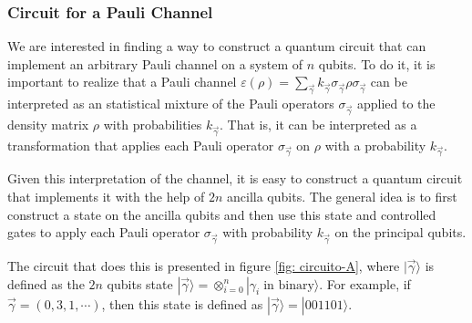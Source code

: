 \subsubsection{Circuit for a Pauli Channel}

We are interested in finding a way to construct a quantum circuit that can implement an arbitrary Pauli channel on a system of $n$ qubits. To do it, it is important to realize that a Pauli channel $\varepsilon (\rho) = \sum_{\vec{\gamma}} k_{\vec{\gamma}} \sigma_{\vec{\gamma}} \rho \sigma_{\vec{\gamma}}$ can be interpreted as an statistical mixture of the Pauli operators $\sigma_{\vec{\gamma}}$ applied to the density matrix $\rho$  with  probabilities $k_{\vec{\gamma}}$. That is, it can be interpreted as a transformation that applies each Pauli operator $\sigma_{\vec{\gamma}}$ on $\rho$ with a probability $k_{\vec{\gamma}}$.

Given this interpretation of the channel, it is easy to construct a quantum circuit that implements it with the help of $2n$ ancilla qubits. The general idea is to first construct a state on the ancilla qubits and then use this state and controlled gates to  apply each Pauli operator $\sigma_{\vec{\gamma}}$ with probability $k_{\vec{\gamma}}$ on the principal qubits. 

The circuit that does this is presented in figure \ref{fig: circuito-A}, where $|\vec{\gamma}\rangle$ is defined as the $2n$ qubits state $|\vec{\gamma} \rangle = \otimes_{i=0}^n |\gamma_i \; \text{in binary} \rangle$. For example, if $\vec{\gamma} = (0,3,1,\cdots)$, then this state is defined as $|\vec{\gamma} \rangle = |001101 \rangle$.

